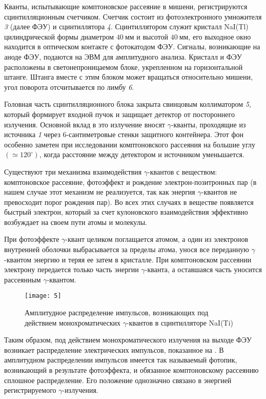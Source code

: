 \documentclass[a4paper, 12pt]{article}
\begin{document}
Кванты, испытывающие комптоновское рассеяние в мишени, регистрируются
сцинтилляционным счетчиком. Счетчик состоит из фотоэлектронного
умножителя \textsl{3} (далее ФЭУ) и сцинтиллятора \textsl{4}. Сцинтиллятором служит
кристалл NaI(Tl) цилиндрической формы диаметром $40\: \text{мм}$ и
высотой $40\: \text{мм}$, его выходное окно находится в оптическом
контакте с фотокатодом ФЭУ. Сигналы, возникающие на аноде ФЭУ,
подаются на ЭВМ для амплитудного анализа. Кристалл и ФЭУ расположены в
светонепроницаемом блоке, укрепленном на горизонтальной штанге. Штанга
вместе с этим блоком может вращаться относительно мишени, угол
поворота отсчитывается по лимбу \textsl{6}.

Головная часть сцинтилляционного блока закрыта свинцовым коллиматором
\textsl{5}, который формирует входной пучок и защищает детектор от
постороннего излучения. Основной вклад в это излучение вносят
$\gamma$-кванты, проходящие из источника \textsl{1} через
$6$-сантиметровые стенки защитного контейнера. Этот фон особенно
заметен при исследовании комптоновского рассеяния на большие углу
$(\simeq 120 ^{\circ})$, когда расстояние между детектором и
источником уменьшается.


Существуют три механизма взаимодействия $\gamma$-квантов с веществом:
комптоновское рассеяние, фотоэффект и рождение электрон-позитронных
пар (в нашем случае этот механизм не реализуется, так как энергия
$\gamma$-квантов не превосходит порог рождения пар). Во всех этих
случаях в веществе появляется быстрый электрон, который за счет
кулоновского взаимодействия эффективно возбуждает на своем пути атомы
и молекулы.

При фотоэффекте $\gamma$-квант целиком поглащается атомом, а один из
электронов внутренней оболочки выбрасывается за пределы атома, унося
все переданную $\gamma$-квантом энергию и теряя ее затем в кристалле.
При комптоновском рассеянии электрону передается только часть энергии
$\gamma$-кванта, а оставшаяся часть уносится рассеянным
$\gamma$-квантом.


\begin{wrapfigure}{l}{0.5\linewidth}
    \texttt{[image: 5]}
    \caption{Амплитудное распределение импульсов, возникающих под
    действием монохроматических $\gamma$-квантов в сцинтилляторе
NaI(Ti)}
\label{fig:5}
\end{wrapfigure}

Таким образом, под действием монохроматического излучения на выходе
ФЭУ возникает распределение электрических импульсов, показанное на
. В амплитудном распределении импульсов имеется так
называемый фотопик, возникающий в результате фотоэффекта, и обязанное
комптоновскому рассеянию сплошное распределение. Его положение
однозначно связано в энергией регистрируемого $\gamma$-излучения.
\end{document}
